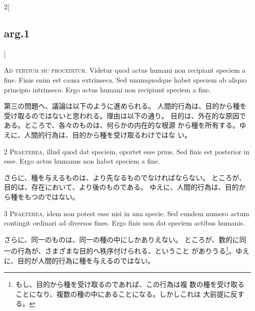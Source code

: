 \documentclass[paper=a4paper,fontsize=10pt,jafontsize=9pt,titlepage]{jlreq}
\begin{document}
\begin{paracol}{2}[\subsection{arg.1}]

{\Huge A}{\scshape d tertium sic proceditur}. Videtur quod
actus humani non recipiant speciem a fine. Finis enim est causa
extrinseca. Sed unumquodque habet speciem ab aliquo principio
intrinseco. Ergo actus humani non recipiunt speciem a fine.

\switchcolumn

第三の問題へ、議論は以下のように進められる。
人間的行為は、目的から種を受け取るのではないと思われる。理由は以下の通り。
目的は、外在的な原因である。ところで、各々のものは、何らかの内在的な根源
 から種を所有する。ゆえに、人間的行為は、目的から種を受け取るわけではな
 い。


{\scshape 2 Praeterea}, illud quod dat speciem,
oportet esse prius. Sed finis est posterior in esse. Ergo actus humanus
non habet speciem a fine.

\switchcolumn

さらに、種を与えるものは、より先なるものでなければならない。
ところが、目的は、存在において、より後のものである。
ゆえに、人間的行為は、目的から種をもつのではない。


{\scshape 3 Praeterea}, idem non potest esse nisi in
una specie. Sed eundem numero actum contingit ordinari ad diversos
fines. Ergo finis non dat speciem actibus humanis.

\switchcolumn

さらに、同一のものは、同一の種の中にしかありえない。
ところが、数的に同一の行為が、さまざまな目的へ秩序付けられる、ということ
 がありうる\footnote{もし、目的から種を受け取るのであれば、この行為は複
 数の種を受け取ることになり、複数の種の中にあることになる。しかしこれは
 大前提に反する。}。ゆえに、目的が人間的行為に種を与えるのではない。

\switchcolumn*[\subsection{s.c.}]


\end{paracol}
\end{document}
